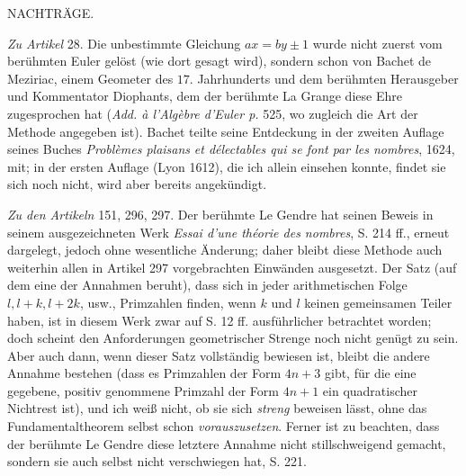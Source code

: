 \clearpage
{}


\begin{center}NACHTRÄGE.\end{center}
\textit{Zu Artikel} 28. Die unbestimmte Gleichung \(ax=by\pm1\) wurde nicht zuerst vom berühmten Euler gelöst (wie dort gesagt wird), sondern schon von Bachet de Meziriac, einem Geometer des \(17\). Jahrhunderts und dem berühmten Herausgeber und Kommentator Diophants, dem der berühmte La Grange diese Ehre zugesprochen hat (\textit{Add. à l'Algèbre d'Euler p.} 525, wo zugleich die Art der Methode angegeben ist). Bachet teilte seine Entdeckung in der zweiten Auflage seines Buches \textit{Problèmes plaisans} \textit{et délectables qui se font par les nombres}, 1624, mit; in der ersten Auflage (Lyon 1612), die ich allein einsehen konnte, findet sie sich noch nicht, wird aber bereits angekündigt.

\textit{Zu den Artikeln} 151, 296, 297. Der berühmte Le Gendre hat seinen Beweis in seinem ausgezeichneten Werk \textit{Essai d'une théorie des nombres}, S. 214 ff., erneut dargelegt, jedoch ohne wesentliche Änderung; daher bleibt diese Methode auch weiterhin allen in Artikel 297 vorgebrachten Einwänden ausgesetzt. Der Satz (auf dem eine der Annahmen beruht), dass sich in jeder arithmetischen Folge \(l,\allowbreak l+k,\allowbreak l+2k\), usw., Primzahlen finden, wenn \(k\) und \(l\) keinen gemeinsamen Teiler haben, ist in diesem Werk zwar auf S. 12 ff. ausführlicher betrachtet worden; doch scheint den Anforderungen geometrischer Strenge noch nicht genügt zu sein. Aber auch dann, wenn dieser Satz vollständig bewiesen ist, bleibt die andere Annahme bestehen (dass es Primzahlen der Form \(4n+3\) gibt, für die eine gegebene, positiv genommene Primzahl der Form \(4n+1\) ein quadratischer Nichtrest ist), und ich weiß nicht, ob sie sich \textit{streng} beweisen lässt, ohne das Fundamentaltheorem selbst schon \textit{vorauszusetzen}. Ferner ist zu beachten, dass der berühmte Le Gendre diese letztere Annahme nicht stillschweigend gemacht, sondern sie auch selbst nicht verschwiegen hat, S. 221.

